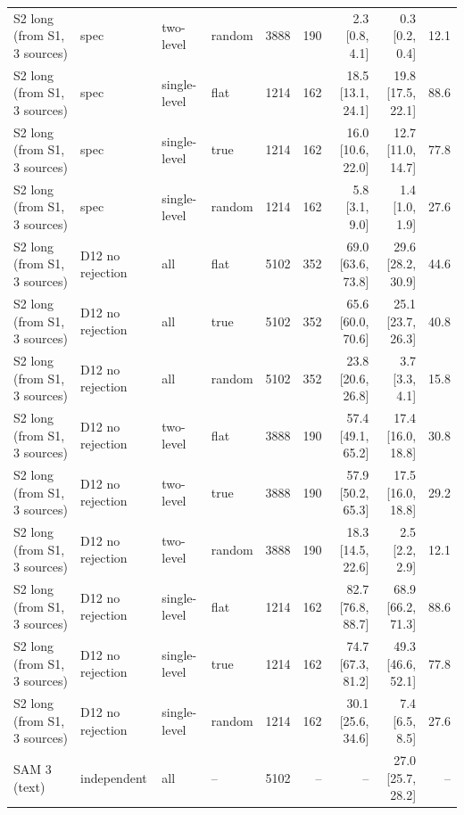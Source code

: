\begin{tabular}{llllrrrrr}
S2 long (from S1, 3 sources) & spec & two-level & random & 3888 & 190 & 2.3 \scriptsize{[0.8, 4.1]} & 0.3 \scriptsize{[0.2, 0.4]} & 12.1 \\
S2 long (from S1, 3 sources) & spec & single-level & flat & 1214 & 162 & 18.5 \scriptsize{[13.1, 24.1]} & 19.8 \scriptsize{[17.5, 22.1]} & 88.6 \\
S2 long (from S1, 3 sources) & spec & single-level & true & 1214 & 162 & 16.0 \scriptsize{[10.6, 22.0]} & 12.7 \scriptsize{[11.0, 14.7]} & 77.8 \\
S2 long (from S1, 3 sources) & spec & single-level & random & 1214 & 162 & 5.8 \scriptsize{[3.1, 9.0]} & 1.4 \scriptsize{[1.0, 1.9]} & 27.6 \\
\midrule
S2 long (from S1, 3 sources) & D12 no rejection & all & flat & 5102 & 352 & 69.0 \scriptsize{[63.6, 73.8]} & 29.6 \scriptsize{[28.2, 30.9]} & 44.6 \\
S2 long (from S1, 3 sources) & D12 no rejection & all & true & 5102 & 352 & 65.6 \scriptsize{[60.0, 70.6]} & 25.1 \scriptsize{[23.7, 26.3]} & 40.8 \\
S2 long (from S1, 3 sources) & D12 no rejection & all & random & 5102 & 352 & 23.8 \scriptsize{[20.6, 26.8]} & 3.7 \scriptsize{[3.3, 4.1]} & 15.8 \\
S2 long (from S1, 3 sources) & D12 no rejection & two-level & flat & 3888 & 190 & 57.4 \scriptsize{[49.1, 65.2]} & 17.4 \scriptsize{[16.0, 18.8]} & 30.8 \\
S2 long (from S1, 3 sources) & D12 no rejection & two-level & true & 3888 & 190 & 57.9 \scriptsize{[50.2, 65.3]} & 17.5 \scriptsize{[16.0, 18.8]} & 29.2 \\
S2 long (from S1, 3 sources) & D12 no rejection & two-level & random & 3888 & 190 & 18.3 \scriptsize{[14.5, 22.6]} & 2.5 \scriptsize{[2.2, 2.9]} & 12.1 \\
S2 long (from S1, 3 sources) & D12 no rejection & single-level & flat & 1214 & 162 & 82.7 \scriptsize{[76.8, 88.7]} & 68.9 \scriptsize{[66.2, 71.3]} & 88.6 \\
S2 long (from S1, 3 sources) & D12 no rejection & single-level & true & 1214 & 162 & 74.7 \scriptsize{[67.3, 81.2]} & 49.3 \scriptsize{[46.6, 52.1]} & 77.8 \\
S2 long (from S1, 3 sources) & D12 no rejection & single-level & random & 1214 & 162 & 30.1 \scriptsize{[25.6, 34.6]} & 7.4 \scriptsize{[6.5, 8.5]} & 27.6 \\
\midrule
SAM 3 (text) & independent & all & -- & 5102 & -- & -- & 27.0 \scriptsize{[25.7, 28.2]} & -- \\

\end{tabular}
